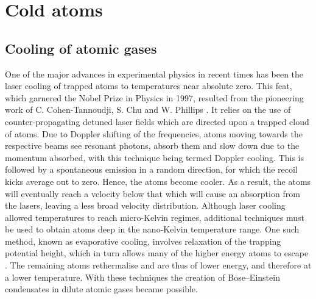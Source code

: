 \section{Cold atoms}
\subsection{Cooling of atomic gases}\label{sub:cooling}
One of the major advances in experimental physics in recent times has been the laser cooling of trapped atoms to temperatures near absolute zero. This feat, which garnered the Nobel Prize in Physics in 1997, resulted from the pioneering work of C. Cohen-Tannoudji, S. Chu and W. Phillips \cite{AO:Chu_revmod_1998,AO:Cohen_revmod_1998,AO:Phillips_revmod_1998}. It relies on the use of counter-propagating detuned laser fields which are directed upon a trapped cloud of atoms. Due to Doppler shifting of the frequencies, atoms moving towards the respective beams see resonant photons, absorb them and slow down due to the momentum absorbed, with this technique being termed Doppler cooling. This is followed by a spontaneous emission in a random direction, for which the recoil kicks average out to zero. Hence, the atoms become cooler. As a result, the atoms will eventually reach a velocity below that which will cause an absorption from the lasers, leaving a less broad velocity distribution. Although laser cooling allowed temperatures to reach micro-Kelvin regimes, additional techniques must be used to obtain atoms deep in the nano-Kelvin temperature range. One such method, known as evaporative cooling, involves relaxation of the trapping potential height, which in turn allows many of the higher energy atoms to escape \cite{AO:Ketterle_amop_1996}. The remaining atoms rethermalise and are thus of lower energy, and therefore at a lower temperature. With these techniques the creation of Bose--Einstein condensates in dilute atomic gases became possible.


